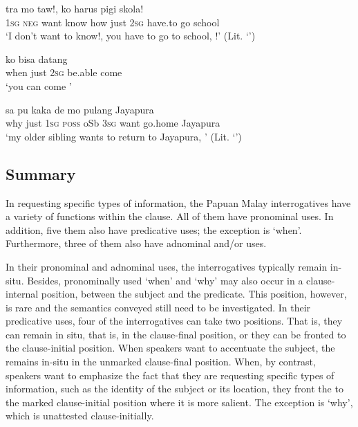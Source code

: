 \ea
\label{Example_5.293}
 {tra} {mo} {taw!,} {} {} {ko} {harus} {pigi} {skola!}\\ %
 \textsc{1sg}  \textsc{neg}  want  know  how  just  \textsc{2sg}  have.to  go  school\\
 ‘I don’t want to know!, you have to go to school, !’ (Lit. ‘’) \textstyleExampleSource{[Elicited MY131112.001]}
\z

\ea
\label{Example_5.294}

\gll  {}    ko  bisa  datang\\
 when  just  \textsc{2sg}  be.able  come\\
\glt 
‘you can come ’ \textstyleExampleSource{[Elicited MY131112.002]}
\z

\ea
\label{Example_5.295}
 {} {sa} {pu} {kaka} {de} {mo} {pulang} {Jayapura}\\ %
 why  just  \textsc{1sg}  \textsc{poss}  oSb  \textsc{3sg}  want  go.home  Jayapura\\
\glt
‘my older sibling wants to return to Jayapura, ’ (Lit. ‘’) \textstyleExampleSource{[Elicited MY131112.002]}
\z


\subsection{Summary}\label{Para_5.8.9}

In requesting specific types of information, the Papuan Malay interrogatives have a variety of functions within the clause. All of them have pronominal uses. In addition, five them also have predicative uses; the exception is  ‘when’. Furthermore, three of them also have adnominal and/or  uses.



In their pronominal and adnominal uses, the interrogatives typically remain in-situ. Besides, pronominally used  ‘when’ and  ‘why’ may also occur in a clause-internal position, between the subject and the predicate. This position, however, is rare and the semantics conveyed still need to be investigated. In their predicative uses, four of the interrogatives can take two positions. That is, they can remain in situ, that is, in the clause-final position, or they can be fronted to the clause-initial position. When speakers want to accentuate the subject, the  remains in-situ in the unmarked clause-final position. When, by contrast, speakers want to emphasize the fact that they are requesting specific types of information, such as the identity of the subject or its location, they front the  to the marked clause-initial position where it is more salient. The exception is  ‘why’, which is unattested clause-initially.



